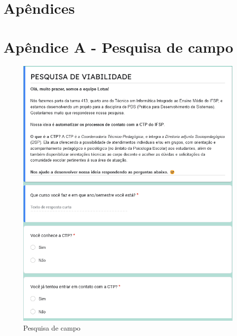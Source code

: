 \documentclass[12pt,a4paper]{article}
\begin{document}
\appendix
\thispagestyle{plain}
\section*{Apêndices}
\section{Apêndice A - Pesquisa de campo}

\begin{figure}[H]
    \centering
    \caption{Pesquisa de campo}
     \includegraphics[width=15cm]{foto1.png}
\end{figure}

\newpage
\end{document}
